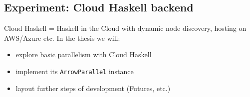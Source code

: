 \subsection{Experiment: Cloud Haskell backend}

\begin{frame}[fragile]{}
Cloud Haskell = Haskell in the Cloud with dynamic node discovery,
hosting on AWS/Azure etc. In the thesis we will:
\\
\begin{itemize}
\item explore basic parallelism with Cloud Haskell
\item implement its \lstinline{ArrowParallel} instance
\item layout further steps of development (Futures, etc.)
\end{itemize}
\end{frame}
